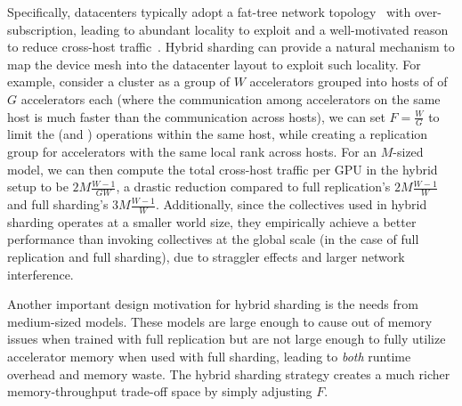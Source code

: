 Specifically, datacenters typically adopt a fat-tree network topology~\cite{liu2017incbricks} with over-subscription, leading to abundant locality to exploit and a well-motivated reason to reduce cross-host traffic~\cite{luo2020plink}. Hybrid sharding can provide a natural mechanism to map the device mesh into the datacenter layout to exploit such locality. For example, consider a cluster as a group of $W$ accelerators grouped into hosts of of $G$ accelerators each (where the communication among accelerators on the same host is much faster than the communication across hosts), we can set $F = \frac{W}{G}$ to limit the  (and ) operations within the same host, while creating a replication group for accelerators with the same local rank across hosts. For an $M$-sized model, we can then compute the total cross-host traffic per GPU in the hybrid setup to be $2M\frac{W-1}{GW}$, a drastic reduction compared to full replication's $2M\frac{W-1}{W}$ and full sharding's $3M\frac{W-1}{W}$. Additionally, since the  collectives used in hybrid sharding operates at a smaller world size, they empirically achieve a better performance than invoking collectives at the global scale (in the case of full replication and full sharding), due to straggler effects and larger network interference. 

Another important design motivation for hybrid sharding is the needs from medium-sized models. These models are large enough to cause out of memory issues when trained with full replication but are not large enough to fully utilize accelerator memory when used with full sharding, leading to \emph{both} runtime overhead and memory waste. The hybrid sharding strategy creates a much richer memory-throughput trade-off space by simply adjusting $F$.



